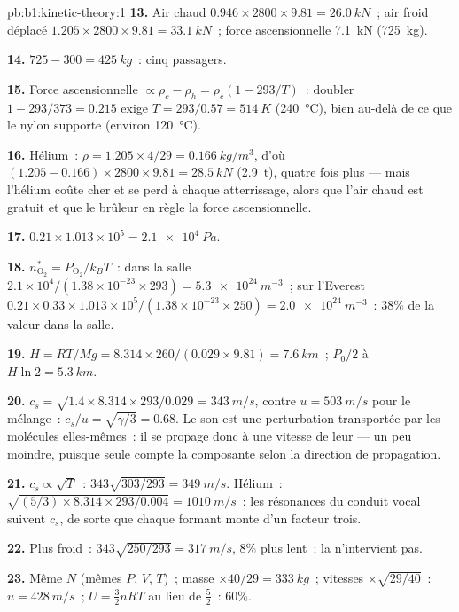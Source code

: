 \begin{solution}{pb:b1:kinetic-theory:1}
\textbf{13.} Air chaud $0.946 \times 2800 \times 9.81 = \qty{26.0}{kN}$~; air froid
déplacé $1.205 \times 2800 \times 9.81 = \qty{33.1}{kN}$~; force ascensionnelle \qty{7.1}{kN}
(\qty{725}{kg}).

\textbf{14.} $725 - 300 = \qty{425}{kg}$~: cinq passagers.

\textbf{15.} Force ascensionnelle $\propto \rho_c - \rho_h = \rho_c(1 - 293/T)$~: doubler
$1 - 293/373 = 0.215$ exige $T = 293/0.57 = \qty{514}{K}$ (\qty{240}{\degreeCelsius}),
bien au-delà de ce que le nylon supporte (environ \qty{120}{\degreeCelsius}).

\textbf{16.} Hélium~: $\rho = 1.205 \times 4/29 = \qty{0.166}{kg/m^3}$, d'où
$(1.205 - 0.166) \times 2800 \times 9.81 = \qty{28.5}{kN}$ (\qty{2.9}{t}), quatre
fois plus --- mais l'hélium coûte cher et se perd à chaque atterrissage,
alors que l'air chaud est gratuit et que le brûleur en règle la force ascensionnelle.

\textbf{17.} $0.21 \times 1.013\times10^5 = \qty{2.1e4}{Pa}$.

\textbf{18.} $n^*_{\mathrm{O}_2} = P_{\mathrm{O}_2}/k_BT$~: dans la salle $2.1\times10^4/
(1.38\times10^{-23} \times 293) = \qty{5.3e24}{m^{-3}}$~; sur l'Everest $0.21 \times 0.33
\times 1.013\times10^5/(1.38\times10^{-23} \times 250) = \qty{2.0e24}{m^{-3}}$~:
$38\%$ de la valeur dans la salle.

\textbf{19.} $H = RT/Mg = 8.314 \times 260/(0.029 \times 9.81) = \qty{7.6}{km}$~;
$P_0/2$ à $H\ln 2 = \qty{5.3}{km}$.

\textbf{20.} $c_s = \sqrt{1.4 \times 8.314 \times 293/0.029} = \qty{343}{m/s}$,
contre $u = \qty{503}{m/s}$ pour le mélange~: $c_s/u = \sqrt{\gamma/3} = 0.68$.
Le son est une perturbation transportée par les molécules elles-mêmes~: il
se propage donc à une vitesse de leur  --- un peu moindre,
puisque seule compte la composante selon la direction de propagation.

\textbf{21.} $c_s \propto \sqrt T$~: $343\sqrt{303/293} = \qty{349}{m/s}$.
Hélium~: $\sqrt{(5/3) \times 8.314 \times 293/0.004} = \qty{1010}{m/s}$~: les
résonances du conduit vocal suivent $c_s$, de sorte que chaque formant monte
d'un facteur trois.

\textbf{22.} Plus froid~: $343\sqrt{250/293} = \qty{317}{m/s}$, $8\%$ plus lent~;
la  n'intervient pas.

\textbf{23.} Même $N$ (mêmes $P$, $V$, $T$)~; masse $\times 40/29 = \qty{333}{kg}$~;
vitesses $\times\sqrt{29/40}$~: $u = \qty{428}{m/s}$~; $U = \tfrac32 nRT$ au lieu de
$\tfrac52$~: $60\%$.


\end{solution}
